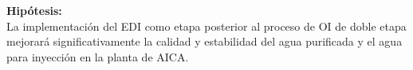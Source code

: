 \textbf{ Hipótesis:}\\
La implementación del EDI como etapa posterior al proceso de OI de doble etapa mejorará significativamente la calidad y estabilidad del agua purificada y el agua para inyección en la planta de AICA.

